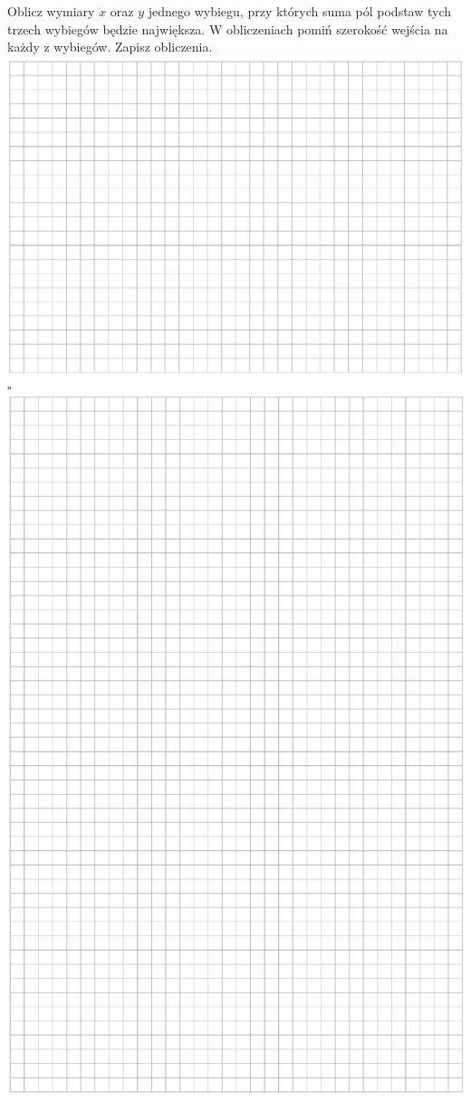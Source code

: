 \documentclass[10pt]{article}
\begin{document}
Oblicz wymiary \(x\) oraz \(y\) jednego wybiegu, przy których suma pól podstaw tych trzech wybiegów będzie największa. W obliczeniach pomiń szerokość wejścia na każdy z wybiegów. Zapisz obliczenia.\\
\includegraphics[max width=\textwidth, center]{2024_11_21_daeb5e5efb43dd4cb535g-27(1)}\\
\(\square\)\\
\includegraphics[max width=\textwidth, center]{2024_11_21_daeb5e5efb43dd4cb535g-28}
\end{document}
